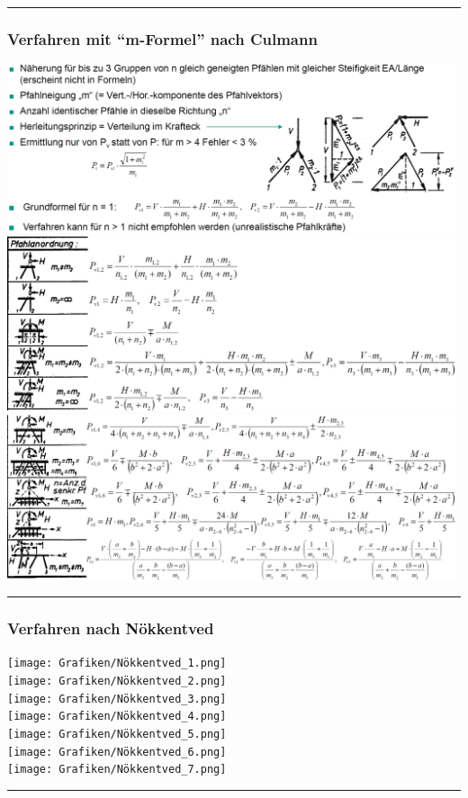 \documentclass[fleqn,twoside]{article}
\begin{document}
\rule{\textwidth}{0.075cm}

\subsubsection{Verfahren mit \enquote{m-Formel} nach Culmann}
\includegraphics[width=0.99\textwidth]{Grafiken/Culmann_1.png}\\
\includegraphics[width=0.99\textwidth]{Grafiken/Culmann_2.png}\\
\includegraphics[width=0.99\textwidth]{Grafiken/Culmann_3.png}\\

\rule{\textwidth}{0.075cm}

\subsubsection{Verfahren nach Nökkentved}
\texttt{[image: Grafiken/Nökkentved\_1.png]}\\
\texttt{[image: Grafiken/Nökkentved\_2.png]}\\
\texttt{[image: Grafiken/Nökkentved\_3.png]}\\
\texttt{[image: Grafiken/Nökkentved\_4.png]}\\
\texttt{[image: Grafiken/Nökkentved\_5.png]}\\
\texttt{[image: Grafiken/Nökkentved\_6.png]}\\
\texttt{[image: Grafiken/Nökkentved\_7.png]}\\
\rule{\textwidth}{0.075cm}
\end{document}
